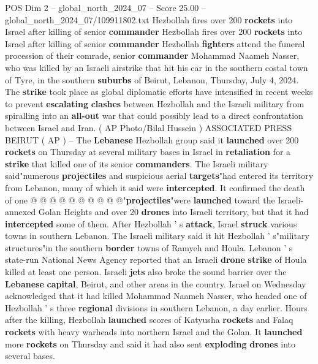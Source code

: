 \begin{textsample}{POS Dim 2 – global\_north\_2024\_07 – Score 25.00 – global\_north\_2024\_07/109911802.txt}  \label{ex:f2_pos_183}
Hezbollah fires over 200 \textbf{rockets} into Israel after killing of senior \textbf{commander} Hezbollah fires over 200 \textbf{rockets} into Israel after killing of senior \textbf{commander} Hezbollah \textbf{fighters} attend the funeral procession of their comrade, senior \textbf{commander} Mohammad Naameh Nasser, who was killed by an Israeli airstrike that hit his car in the southern costal town of Tyre, in the southern \textbf{suburbs} of Beirut, Lebanon, Thursday, July 4, 2024.
The \textbf{strike} took place as global diplomatic efforts have intensified in recent weeks to prevent \textbf{escalating} \textbf{clashes} between Hezbollah and the Israeli military from spiralling into an \textbf{all-out} war that could possibly lead to a direct confrontation between Israel and Iran. ( AP Photo/Bilal Hussein ) ASSOCIATED PRESS BEIRUT ( AP ) -- The \textbf{Lebanese} Hezbollah group said it \textbf{launched} over 200 \textbf{rockets} on Thursday at several military bases in Israel in \textbf{retaliation} for a \textbf{strike} that killed one of its senior \textbf{commanders}.
The Israeli military said"numerous \textbf{projectiles} and suspicious aerial \textbf{targets}"had entered its territory from Lebanon, many of which it said were \textbf{intercepted}.
It confirmed the death of one @ @ @ @ @ @ @ @ @ @"\textbf{projectiles}"were \textbf{launched} toward the Israeli-annexed Golan Heights and over 20 \textbf{drones} into Israeli territory, but that it had \textbf{intercepted} some of them.
After Hezbollah ' s \textbf{attack}, Israel \textbf{struck} various towns in southern Lebanon.
The Israeli military said it hit Hezbollah ' s"military structures"in the southern \textbf{border} towns of Ramyeh and Houla.
Lebanon ' s state-run National News Agency reported that an Israeli \textbf{drone} \textbf{strike} of Houla killed at least one person.
Israeli \textbf{jets} also broke the sound barrier over the \textbf{Lebanese} \textbf{capital}, Beirut, and other areas in the country.
Israel on Wednesday acknowledged that it had killed Mohammad Naameh Nasser, who headed one of Hezbollah ' s three \textbf{regional} divisions in southern Lebanon, a day earlier.
Hours after the killing, Hezbollah \textbf{launched} scores of Katyusha \textbf{rockets} and Falaq \textbf{rockets} with heavy warheads into northern Israel and the Golan.
It \textbf{launched} more \textbf{rockets} on Thursday and said it had also sent \textbf{exploding} \textbf{drones} into several bases.

\end{textsample}
